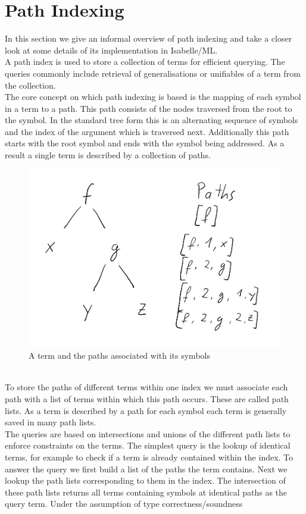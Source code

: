 \chapter{Path Indexing}
In this section we give an informal overview of path indexing and take a closer look at some details of its implementation in Isabelle/ML.\\
A path index is used to store a collection of terms for efficient querying. The queries commonly include retrieval of generalisations or unifiables of a term from the collection.\\
The core concept on which path indexing is based is the mapping of each symbol in a term to a path. This path consists of the nodes traversed from the root to the symbol. In the standard tree form this is an alternating sequence of symbols and the index of the argument which is traversed next. Additionally this path starts with the root symbol and ends with the symbol being addressed. As a result a single term is described by a collection of paths.\\
\begin{figure}[h]
\centering
\includegraphics[scale=0.25]{figures/term_path.png}
\caption{A term and the paths associated with its symbols}
\end{figure}\\
To store the paths of different terms within one index we must associate each path with a list of terms within which this path occurs. These are called path lists. As a term is described by a path for each symbol each term is generally saved in many path lists.\\
The queries are based on intersections and unions of the different path lists to enforce constraints on the terms. The simplest query is the lookup of identical terms, for example to check if a term is already contained within the index. To answer the query we first build a list of the paths the term contains. Next we lookup the path lists corresponding to them in the index. The intersection of these path lists returns all terms containing symbols at identical paths as the query term. Under the assumption of type correctness/soundness 

